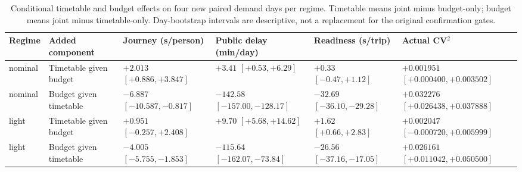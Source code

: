 \begin{table}[t]
\centering\footnotesize
\caption{Conditional timetable and budget effects on four new paired demand days per regime. Timetable means joint minus budget-only; budget means joint minus timetable-only. Day-bootstrap intervals are descriptive, not a replacement for the original confirmation gates.}
\label{tab:factorial}
\setlength{\tabcolsep}{4pt}
\begin{tabularx}{\textwidth}{@{}llYYYY@{}}\toprule
Regime & Added component & Journey (s/person) & Public delay (min/day) & Readiness (s/trip) & Actual CV$^2$ \\ \midrule
nominal & Timetable given budget &  &  &  &  \\[2pt]
nominal & Budget given timetable &  &  &  &  \\[2pt]
light & Timetable given budget &  &  &  &  \\[2pt]
light & Budget given timetable &  &  &  &  \\[2pt]

\end{tabularx}
\end{table}
